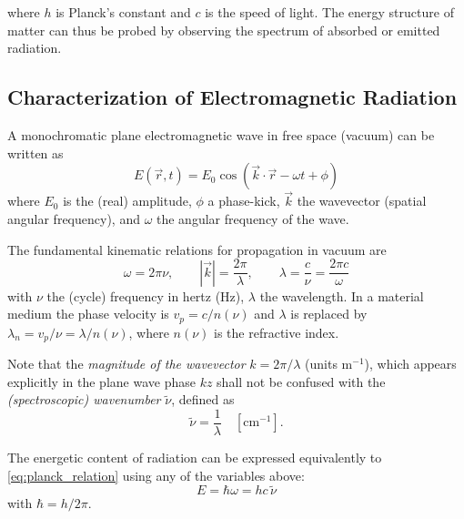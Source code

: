 \noindent where $h$ is Planck's constant and $c$ is the speed of light. The energy structure of matter can thus be probed by observing the spectrum of absorbed or emitted radiation.

\subsection{Characterization of Electromagnetic Radiation}
\label{subsec:em_radiation_characterization}

\noindent A monochromatic plane electromagnetic wave in free space (vacuum) can be written as
\begin{equation}
	E(\vec{r},t) = E_0 \cos(\vec{k} \cdot \vec{r} - \omega t + \phi)
	\label{eq:plane_wave}
\end{equation}
where $E_0$ is the (real) amplitude, $\phi$ a phase-kick, $\vec{k}$ the wavevector (spatial angular frequency), and $\omega$ the angular frequency of the wave.

The fundamental kinematic relations for propagation in vacuum are
\begin{equation}
	\omega = 2\pi\nu, \qquad |\vec{k}| = \frac{2\pi}{\lambda}, \qquad \lambda = \frac{c}{\nu} = \frac{2\pi c}{\omega}
	\label{eq:wavelength_frequency_relation}
\end{equation}
with $\nu$ the (cycle) frequency in hertz (Hz), $\lambda$ the wavelength. In a material medium the phase velocity is $v_p = c/n(\nu)$ and $\lambda$ is replaced by $\lambda_n = v_p/\nu = \lambda/n(\nu)$, where $n(\nu)$ is the refractive index.

\noindent Note that the \emph{magnitude of the wavevector } $k = 2\pi/\lambda$ (units m$^{-1}$), which appears explicitly in the plane wave phase $kz$ shall not be confused with the \emph{(spectroscopic) wavenumber} $\tilde{\nu}$, defined as
\begin{equation}
	\tilde{\nu} = \frac{1}{\lambda} \quad [\mathrm{cm}^{-1}].
	\label{eq:wavenumber_definition}
\end{equation}

The energetic content of radiation can be expressed equivalently to \eqref{eq:planck_relation} using any of the variables above:
\begin{equation}
	E = \hbar\omega = h c \, \tilde{\nu}
	\label{eq:energy_wavenumber_conversion}
\end{equation}
with $\hbar = h/2\pi$.

